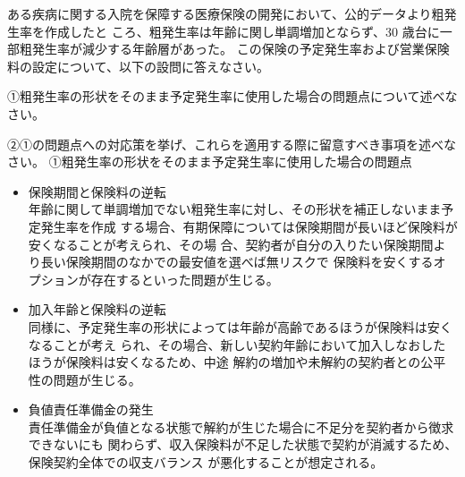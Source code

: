 \documentclass[report,gutter=10mm,fore-edge=10mm,uplatex,dvipdfmx]{jlreq}
\begin{document}
ある疾病に関する入院を保障する医療保険の開発において、公的データより粗発生率を作成したと
ころ、粗発生率は年齢に関し単調増加とならず、30 歳台に一部粗発生率が減少する年齢層があった。
この保険の予定発生率および営業保険料の設定について、以下の設問に答えなさい。

①粗発生率の形状をそのまま予定発生率に使用した場合の問題点について述べなさい。

②①の問題点への対応策を挙げ、これらを適用する際に留意すべき事項を述べなさい。
①粗発生率の形状をそのまま予定発生率に使用した場合の問題点
\begin{itemize}
 \item 保険期間と保険料の逆転\\
年齢に関して単調増加でない粗発生率に対し、その形状を補正しないまま予定発生率を作成
する場合、有期保障については保険期間が長いほど保険料が安くなることが考えられ、その場
合、契約者が自分の入りたい保険期間より長い保険期間のなかでの最安値を選べば無リスクで
保険料を安くするオプションが存在するといった問題が生じる。
 \item 加入年齢と保険料の逆転\\
同様に、予定発生率の形状によっては年齢が高齢であるほうが保険料は安くなることが考え
られ、その場合、新しい契約年齢において加入しなおしたほうが保険料は安くなるため、中途
解約の増加や未解約の契約者との公平性の問題が生じる。
 \item 負値責任準備金の発生\\
責任準備金が負値となる状態で解約が生じた場合に不足分を契約者から徴求できないにも
関わらず、収入保険料が不足した状態で契約が消滅するため、保険契約全体での収支バランス
が悪化することが想定される。
\end{itemize}
\end{document}
